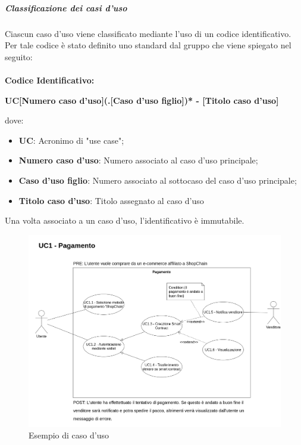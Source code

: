             \subparagraph{Classificazione dei casi d'uso} \label{subparagraph:Classificazione dei casi d'uso}
            Ciascun caso d'uso viene classificato mediante l'uso di un codice identificativo. Per tale codice è stato definito uno standard dal gruppo che viene spiegato nel seguito:\\\\
            \textbf{Codice Identificativo:}\\
            \begin{center}
                \textbf{\Large{UC[Numero caso d’uso](.[Caso d’uso figlio])* - [Titolo caso d’uso]}}
            \end{center}
            dove:
            \begin{itemize}[label={}]
                \item \textbf{UC}: Acronimo di "use case";
                \item \textbf{Numero caso d'uso}: Numero associato al caso d'uso principale;
                \item \textbf{Caso d'uso figlio}: Numero associato al sottocaso del caso d'uso principale;
                \item \textbf{Titolo caso d'uso}: Titolo assegnato al caso d'uso
            \end{itemize}

            Una volta associato a un caso d'uso, l'identificativo è immutabile.
            \begin{figure}[H]
                \centering
                \includegraphics[scale=0.3]{../template/images/useCases/useCase.png}
                \caption{Esempio di caso d'uso}
            \end{figure}
            
